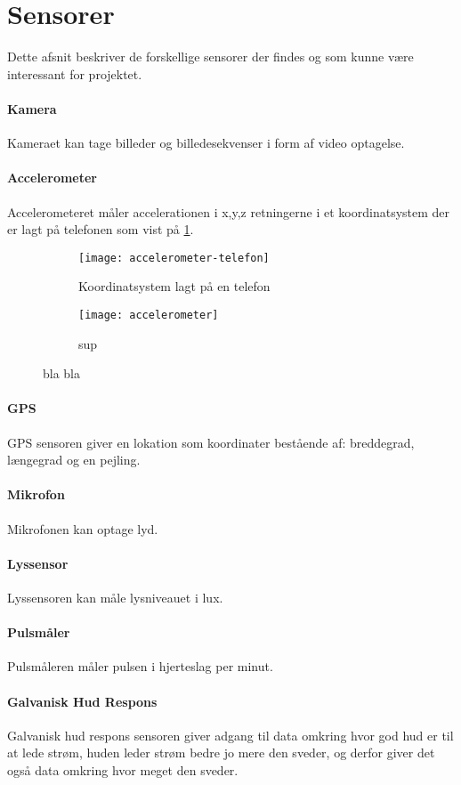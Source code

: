 \section{Sensorer}
Dette afsnit beskriver de forskellige sensorer der findes og som kunne være interessant for projektet. 

\paragraph{Kamera}
Kameraet kan tage billeder og billedesekvenser i form af video optagelse.

\paragraph{Accelerometer}
Accelerometeret måler accelerationen i x,y,z retningerne i et koordinatsystem der er lagt på telefonen som vist på \cref{koord}.

\begin{figure}[h]
	\centering
	\begin{subfigure}[b]{width=0.4\textwidth}
		\texttt{[image: accelerometer-telefon]}
		\caption{Koordinatsystem lagt på en telefon}
		\label{koord}
	\end{subfigure}

	\begin{subfigure}[b]{width=0.4\textwidth}
		\texttt{[image: accelerometer]}
		\caption{sup}
		\label{acc}
	\end{subfigure}
	\caption{bla bla}
	\label{accelerometer}
\end{figure} 

\paragraph{GPS}
GPS sensoren giver en lokation som koordinater bestående af: breddegrad, længegrad og en pejling.

\paragraph{Mikrofon}
Mikrofonen kan optage lyd.

\paragraph{Lyssensor}
Lyssensoren kan måle lysniveauet i lux.

\paragraph{Pulsmåler}
Pulsmåleren måler pulsen i hjerteslag per minut.

\paragraph{Galvanisk Hud Respons}
Galvanisk hud respons sensoren giver adgang til data omkring hvor god hud er til at lede strøm, huden leder strøm bedre jo mere den sveder, og derfor giver det også data omkring hvor meget den sveder.